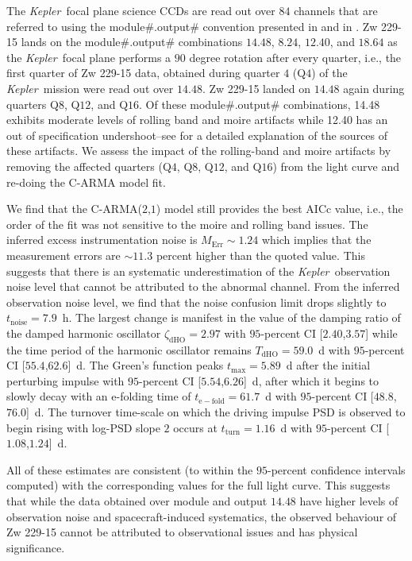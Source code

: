 \documentclass[a4paper,fleqn,usenatbib]{mnras}
\newcommand{\Kepler}{\textit{Kepler~}}
\begin{document}
The \Kepler focal plane science CCDs are read out over $84$ channels that are referred to using the module\#.output\# convention presented in \citet{KIH} and in \citet{Kasliwal15}. Zw 229-15 lands on the module\#.output\# combinations $14$.$48$, $8$.$24$, $12$.$40$, and $18$.$64$ as the \Kepler focal plane performs a $90$ degree rotation after every quarter, i.e., the first quarter of Zw 229-15 data, obtained during quarter $4$ (Q$4$) of the \Kepler mission were read out over $14$.$48$. Zw 229-15 landed on $14$.$48$ again during quarters Q$8$, Q$12$, and Q$16$. Of these module\#.output\# combinations, 14.48 exhibits moderate levels of rolling band and moire artifacts while 12.40 has an out of specification undershoot--see \citet{KIH} for a detailed explanation of the sources of these artifacts. We assess the impact of the rolling-band and moire artifacts by removing the affected quarters (Q$4$, Q$8$, Q$12$, and Q$16$) from the light curve and re-doing the C-ARMA model fit.

We find that the C-ARMA($2$,$1$) model still provides the best AICc value, i.e., the order of the fit was not sensitive to the moire and rolling band issues. The inferred excess instrumentation noise is $M_{\mathrm{Err}} \sim 1.24$ which implies that the measurement errors are $\sim 11.3$ percent higher than the quoted value. This suggests that there is an systematic underestimation of the \Kepler observation noise level that cannot be attributed to the abnormal channel. From the inferred observation noise level, we find that the noise confusion limit drops slightly to $t_{\mathrm{noise}} = 7.9$~h. The largest change is manifest in the value of the damping ratio of the damped harmonic oscillator $\zeta_{\mathrm{dHO}} = 2.97$ with $95$-percent CI [$2.40$,$3.57$] while the time period of the harmonic oscillator remains $T_{\mathrm{dHO}} = 59.0$~d with $95$-percent CI [$55.4$,$62.6$]~d. The Green's function peaks $t_{\mathrm{max}} = 5.89$~d after the initial perturbing impulse with $95$-percent CI [$5.54$,$6.26$]~d, after which it begins to slowly decay with an e-folding time of $t_{\mathrm{e-fold}} = 61.7$~d with $95$-percent CI [$48.8$,$76.0$]~d. The turnover time-scale on which the driving impulse PSD is observed to begin rising with log-PSD slope $2$ occurs at $t_{\mathrm{turn}} = 1.16$~d with $95$-percent CI [$1.08$,$1.24$]~d.

All of these estimates are consistent (to within the $95$-percent confidence intervals computed) with the corresponding values for the full light curve. This suggests that while the data obtained over module and output $14$.$48$ have higher levels of observation noise and spacecraft-induced systematics, the observed behaviour of Zw 229-15 cannot be attributed to observational issues and has physical significance.
\end{document}
